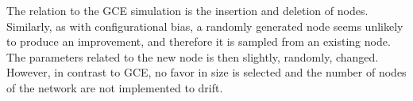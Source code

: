 The relation to the GCE simulation is the insertion and deletion of nodes. Similarly, as with configurational bias, a randomly generated node seems unlikely to produce an improvement, and therefore it is sampled from an existing node. The parameters related to the new node is then slightly, randomly, changed. However, in contrast to GCE, no favor in size is selected and the number of nodes of the network are not implemented to drift.